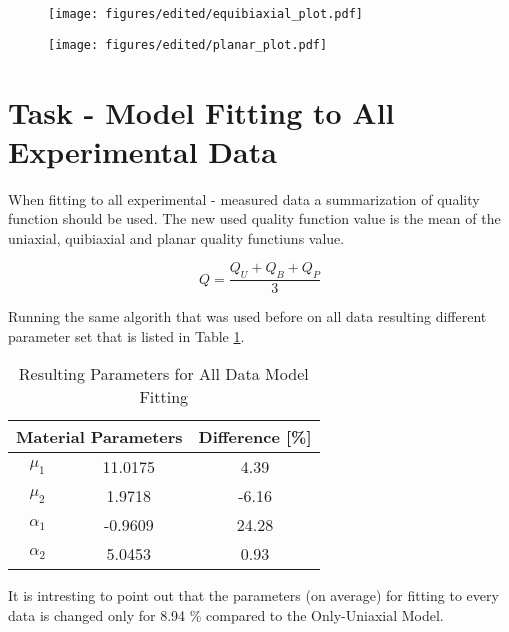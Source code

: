 \documentclass[12pt]{article}
\begin{document}
\begin{figure}[ht!]
  \begin{center}
  \texttt{[image: figures/edited/equibiaxial\_plot.pdf]}
  \label{fig:plot5}
  \end{center}
\end{figure}

\begin{figure}[ht!]
  \begin{center}
  \texttt{[image: figures/edited/planar\_plot.pdf]}
  \label{fig:plot6}
  \end{center}
\end{figure}

\newpage
\section{Task - Model Fitting to All Experimental Data}
When fitting to all experimental - measured data a summarization of quality function should be used. The new used quality function value is the mean of the uniaxial, quibiaxial and planar quality functiuns value.

\begin{equation}
  Q = \frac{Q_U +Q_B + Q_P}{3}
\end{equation}

\noindent Running the same algorith that was used before on all data resulting different parameter set that is listed in Table \ref{tab:param_all}.

\begin{table}[htbp]
  \centering
  \caption{Resulting Parameters for All Data Model Fitting}
  \label{tab:param_all}
  \begin{tabular}{ccc}
      \multicolumn{2}{c}{\textbf{Material Parameters}} & Difference [\%] \\ \hline
      $\mu_1$ & 11.0175 & 4.39 \\
      $\mu_2$ & 1.9718 & -6.16\\
      $\alpha_1$ & -0.9609 & 24.28\\
      $\alpha_2$ & 5.0453 & 0.93\\
  \end{tabular}
\end{table}
It is intresting to point out that the parameters (on average) for fitting to every data is changed only for 8.94 \% compared to the Only-Uniaxial Model.
\end{document}
